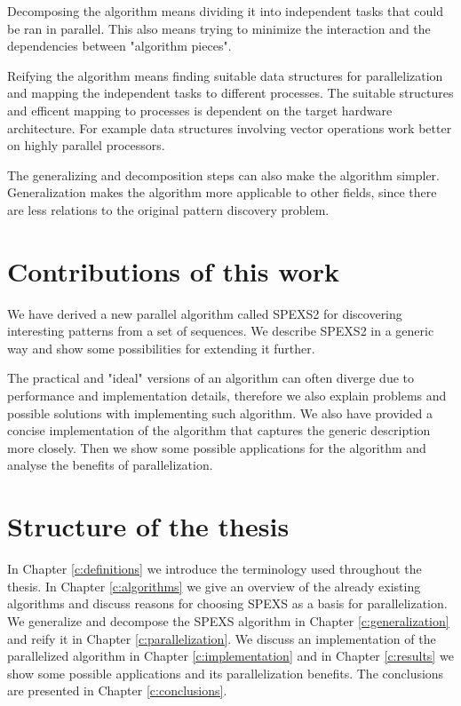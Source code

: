 Decomposing the algorithm means dividing it into independent tasks that could be ran in parallel. This also means trying to minimize the interaction and the dependencies between "algorithm pieces".

Reifying the algorithm means finding suitable data structures for parallelization and mapping the independent tasks to different processes. The suitable structures and efficent mapping to processes is dependent on the target hardware architecture. For example data structures involving vector operations work better on highly parallel processors.

The generalizing and decomposition steps can also make the algorithm simpler. Generalization makes the algorithm more applicable to other fields, since there are less relations to the original pattern discovery problem.

\section{Contributions of this work}

We have derived a new parallel algorithm called SPEXS2 for discovering interesting patterns from a set of sequences. We describe SPEXS2 in a generic way and show some possibilities for extending it further.

The practical and "ideal" versions of an algorithm can often diverge due to performance and implementation details, therefore we also explain problems and possible solutions with implementing such algorithm. We also have provided a concise implementation of the algorithm that captures the generic description more closely. Then we show some possible applications for the algorithm and analyse the benefits of parallelization.

\section{Structure of the thesis}

In Chapter \ref{c:definitions} we introduce the terminology used throughout the thesis. In Chapter \ref{c:algorithms} we give an overview of the already existing algorithms and discuss reasons for choosing SPEXS\cite{spexs} as a basis for parallelization. We generalize and decompose the SPEXS algorithm in Chapter \ref{c:generalization} and reify it in Chapter \ref{c:parallelization}. We discuss an implementation of the parallelized algorithm in Chapter \ref{c:implementation} and in Chapter \ref{c:results} we show some possible applications and its parallelization benefits. The conclusions are presented in Chapter \ref{c:conclusions}.

